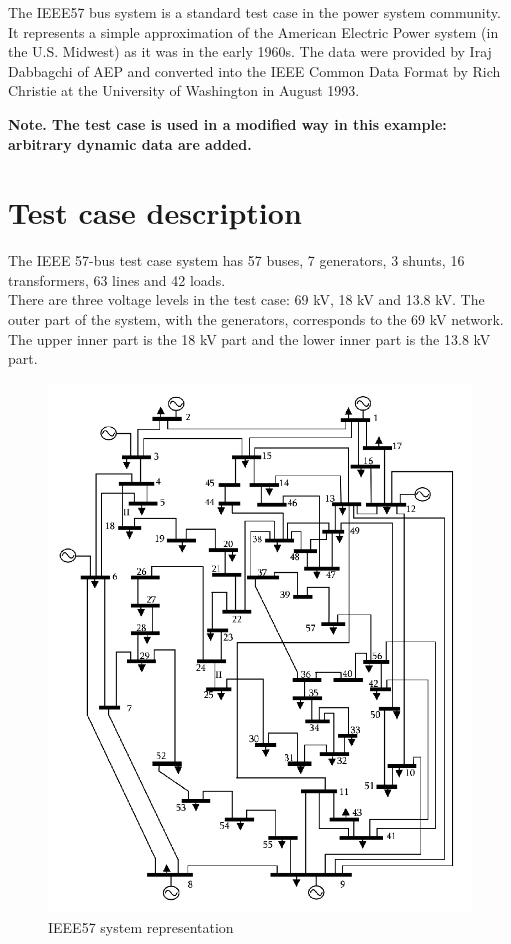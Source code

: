 \documentclass[a4paper, 12pt]{report}
\begin{document}
The IEEE57 bus system is a standard test case in the power system community. It represents a simple approximation of the American Electric Power system (in the U.S. Midwest) as it was in the early 1960s. The data were provided by Iraj Dabbagchi of AEP and converted into the IEEE Common Data Format by Rich Christie at the University of Washington in August 1993.

\textbf{Note. The test case is used in a modified way in this example: arbitrary dynamic data are added.}

\section{Test case description}

The IEEE 57-bus test case system has 57 buses, 7 generators, 3 shunts, 16 transformers, 63 lines and 42 loads.\\
There are three voltage levels in the test case: 69 kV, 18 kV and 13.8 kV. The outer part of the system, with the generators, corresponds to the 69 kV network. The upper inner part is the 18 kV part and the lower inner part is the 13.8 kV part.

\begin{figure}[H]
\includegraphics[scale=0.5]{IEEE57BusSystem.png}
\caption{IEEE57 system representation}
\label{circuit-1}
\end{figure}
\end{document}
